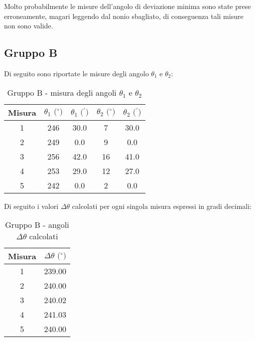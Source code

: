 Molto probabilmente le misure dell'angolo di deviazione minima sono state prese erroneamente, magari leggendo dal nonio sbagliato, di conseguenza tali misure non sono valide.

\subsection{Gruppo B}
Di seguito sono riportate le misure degli angolo $\theta_1$ e $\theta_2$:
\begin{table}[!htbp]
    {\par\centering
    \begin{tabular}{ccccc}
        \hline
            Misura & 
            $\theta_1 \text{ ($^{\circ}$)}$ &
            $\theta_1 \text{ ($^{\prime}$)}$ & 
            $\theta_2 \text{ ($^{\circ}$)}$ & 
            $\theta_2 \text{ ($^{\prime}$)}$ \\
        \hline
        1   &   246 &   30.0    &   7  &   30.0\\
        2   &   249 &   0.0     &   9  &   0.0\\
        3   &   256 &   42.0    &   16 &   41.0\\
        4   &   253 &   29.0    &   12 &   27.0\\
        5   &   242 &   0.0     &   2  &   0.0\\
        \hline
    \end{tabular}
    \par}
    \caption{Gruppo B - misura degli angoli $\theta_1$ e $\theta_2$}
\end{table}

Di seguito i valori $\Delta \theta$ calcolati per ogni singola misura espressi in gradi decimali:
\begin{table}[!htbp]
    {\par\centering
    \begin{tabular}{cc}
        \hline
        Misura & $\Delta \theta \text{ ($^{\circ}$)}$ \\
        \hline
        1   &   239.00 \\
        2   &   240.00 \\
        3   &   240.02 \\
        4   &   241.03 \\
        5   &   240.00 \\
        \hline
    \end{tabular}
    \par}
    \caption{Gruppo B - angoli $\Delta \theta$ calcolati}
\end{table}

